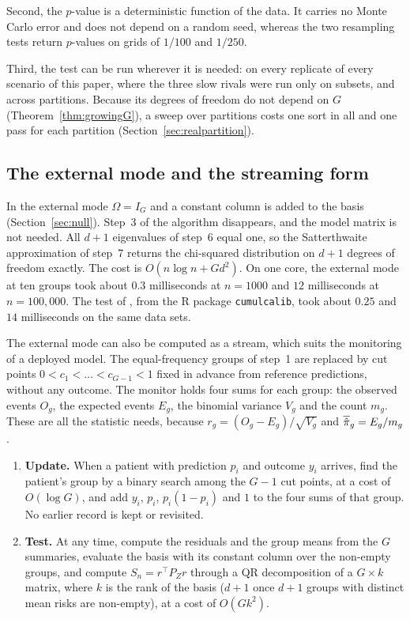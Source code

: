 Second, the $p$-value is a deterministic function of the data. It carries no Monte Carlo error and
does not depend on a random seed, whereas the two resampling tests return $p$-values on grids of
$1/100$ and $1/250$.

Third, the test can be run wherever it is needed: on every replicate of every scenario of this paper,
where the three slow rivals were run only on subsets, and across partitions. Because its degrees of
freedom do not depend on $G$ (Theorem~\ref{thm:growingG}), a sweep over partitions costs one sort in
all and one pass for each partition (Section~\ref{sec:realpartition}).

\subsection{The external mode and the streaming form}\label{sec:streamcomp}

In the external mode $\Omega=I_G$ and a constant column is added to the basis
(Section~\ref{sec:null}). Step~3 of the algorithm disappears, and the model matrix is not needed. All
$d+1$ eigenvalues of step~6 equal one, so the Satterthwaite approximation of step~7 returns the
chi-squared distribution on $d+1$ degrees of freedom exactly. The cost is $O(n\log n+Gd^2)$. On one
core, the external mode at ten groups took about $0.3$ milliseconds at $n=1000$ and $12$ milliseconds at
$n=100{,}000$. The test of \citet{sadatsafavi2024nonparametric}, from the R package \texttt{cumulcalib},
took about $0.25$ and $14$ milliseconds on the same data sets.

The external mode can also be computed as a stream, which suits the monitoring of a deployed model.
The equal-frequency groups of step~1 are replaced by cut points $0<c_1<\dots<c_{G-1}<1$ fixed in
advance from reference predictions, without any outcome. The monitor holds four sums for each group:
the observed events $O_g$, the expected events $E_g$, the binomial variance $V_g$ and the count $m_g$.
These are all the statistic needs, because $r_g=(O_g-E_g)/\sqrt{V_g}$ and $\overline{\hat{\pi}}_g=E_g/m_g$.

\begin{enumerate}
\item \textbf{Update.} When a patient with prediction $p_i$ and outcome $y_i$ arrives, find the
patient's group by a binary search among the $G-1$ cut points, at a cost of $O(\log G)$, and add $y_i$,
$p_i$, $p_i(1-p_i)$ and $1$ to the four sums of that group. No earlier record is kept or revisited.
\item \textbf{Test.} At any time, compute the residuals and the group means from the $G$ summaries,
evaluate the basis with its constant column over the non-empty groups, and compute $S_n=r^\top P_Zr$
through a QR decomposition of a $G\times k$ matrix, where $k$ is the rank of the basis ($d+1$ once
$d+1$ groups with distinct mean risks are non-empty), at a cost of $O(Gk^2)$.
\end{enumerate}

